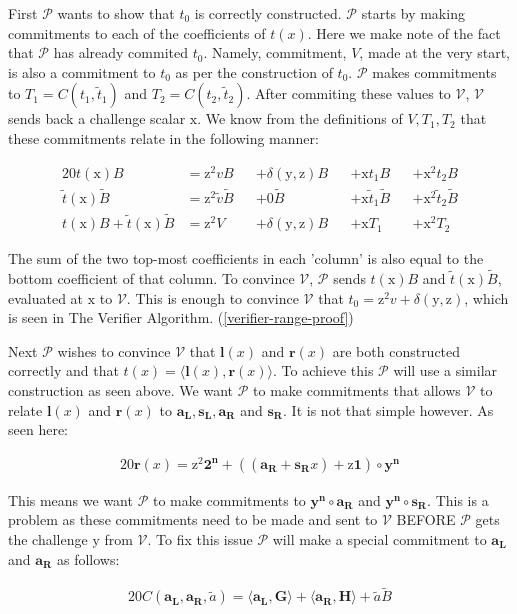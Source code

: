 \documentclass{article}
\newcommand{\eq}[1]{\begin{alignat*}{20}#1\end{alignat*}}
\renewcommand{\vec}[1]{\boldsymbol{#1}}
\newcommand{\ran}[1]{\mathrm{#1}}
\newcommand{\vecran}[1]{\mathbf{#1}}
\newcommand{\V}{\mathcal{V}}
\renewcommand{\P}{\mathcal{P}}
\newcommand{\dotp}[2]{\langle #1, #2 \rangle}
\newcommand{\opn}[1]{\operatorname{#1}}
\newcommand{\vecl}[1]{\vec{#1_{\opn{L}}}}
\newcommand{\vecr}[1]{\vec{#1_{\opn{R}}}}
\newcommand{\tB}{\widetilde{B}}
\renewcommand{\tt}{\widetilde{t}}
\newcommand{\tv}{\widetilde{v}}
\begin{document}
First $\P$ wants to show that $t_0$ is correctly constructed. $\P$
starts by making commitments to each of the coefficients of $t(x)$. Here
we make note of the fact that $\P$ has already commited $t_0$. Namely,
commitment, $V$, made at the very start, is also a commitment to $t_0$
as per the construction of $t_0$. $\P$ makes commitments to $T_1 =
C(t_1, \tt_1)$ and $T_2 = C(t_2, \tt_2)$. After commiting these values
to $\V$, $\V$ sends back a challenge scalar $\ran{x}$. We know from
the definitions of $V, T_1, T_2$ that these commitments relate in the
following manner:

\eq{
	t(\ran{x})B                   &= \ran{z^2}vB      &&+ \delta(\ran{y},\ran{z})B &&+ \ran{x}t_1B       &&+ \ran{x^2}t_2B \\
	\tt(\ran{x})\tB               &= \ran{z^2}\tv \tB &&+ 0\tB                     &&+ \ran{x} \tt_1 \tB &&+ \ran{x^2} \tt_2 \tB\\
	t(\ran{x})B + \tt(\ran{x})\tB &= \ran{z^2}V       &&+ \delta(\ran{y},\ran{z})B &&+ \ran{x}T_1        &&+ \ran{x^2}T_2
}

The sum of the two top-most coefficients in each 'column' is also
equal to the bottom coefficient of that column. To convince $\V$, $\P$
sends $t(\ran{x})B$ and $\tt(\ran{x})\tB$, evaluated at $\ran{x}$
to $\V$. This is enough to convince $\V$ that $t_0 = \ran{z^2}v +
\delta(\ran{y},\ran{z})$, which is seen in The Verifier Algorithm.
(\ref{verifier-range-proof})

Next $\P$ wishes to convince $\V$ that $\vec{l}(x)$ and
$\vec{r}(x)$ are both constructed correctly and that $t(x) =
\dotp{\vec{l}(x)}{\vec{r}(x)}$. To achieve this $\P$ will use a similar
construction as seen above. We want $\P$ to make commitments that allows
$\V$ to relate $\vec{l}(x)$ and $\vec{r}(x)$ to $\vecl{a}, \vecl{s},
\vecr{a}$ and $\vecr{s}$. It is not that simple however. As seen here:

\eq{
	\vec{r}(x) = \ran{z^2}\vec{2^n} + ((\vecr{a} + \vecr{s}x) + \ran{z}\vec{1})\circ\vecran{y^n}
}

This means we want $\P$ to make commitments to $\vec{y^n}\circ \vecr{a}$ and $\vec{y^n}\circ\vecr{s}$. This is a problem as these commitments need to be made and sent to $\V$ BEFORE $\P$ gets the challenge $\ran{y}$ from $\V$. To fix this issue $\P$ will make a special commitment to $\vecl{a}$ and $\vecr{a}$ as follows:

\eq{
	C(\vecl{a}, \vecr{a}, \widetilde{a}) = \dotp{\vecl{a}}{\vec{G}} + \dotp{\vecr{a}}{\vec{H}} + \widetilde{a}\tB
}
\end{document}
